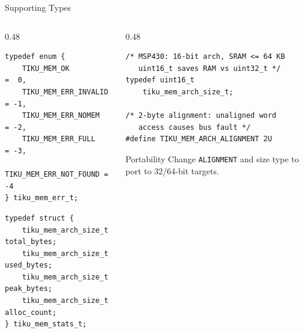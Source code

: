\documentclass[aspectratio=169, 10pt]{beamer}
\begin{document}
\begin{frame}[fragile]{Supporting Types}
\begin{columns}[T]
\begin{column}{0.48\textwidth}
\begin{lstlisting}[style=cstyle, title={Error codes}]
typedef enum {
    TIKU_MEM_OK          =  0,
    TIKU_MEM_ERR_INVALID = -1,
    TIKU_MEM_ERR_NOMEM   = -2,
    TIKU_MEM_ERR_FULL    = -3,
    TIKU_MEM_ERR_NOT_FOUND = -4
} tiku_mem_err_t;
\end{lstlisting}

\begin{lstlisting}[style=cstyle, title={Statistics snapshot}]
typedef struct {
    tiku_mem_arch_size_t total_bytes;
    tiku_mem_arch_size_t used_bytes;
    tiku_mem_arch_size_t peak_bytes;
    tiku_mem_arch_size_t alloc_count;
} tiku_mem_stats_t;
\end{lstlisting}
\end{column}

\begin{column}{0.48\textwidth}
\begin{lstlisting}[style=cstyle, title={arch/msp430/tiku\_mem\_arch.h}]
/* MSP430: 16-bit arch, SRAM <= 64 KB
   uint16_t saves RAM vs uint32_t */
typedef uint16_t
    tiku_mem_arch_size_t;

/* 2-byte alignment: unaligned word
   access causes bus fault */
#define TIKU_MEM_ARCH_ALIGNMENT 2U
\end{lstlisting}

\vspace{0.5em}
\begin{block}{Portability}
Change \texttt{ALIGNMENT} and size type to port to 32/64-bit targets.
\end{block}
\end{column}
\end{columns}
\end{frame}
\end{document}
